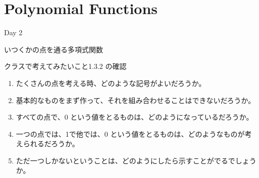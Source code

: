 \documentclass[10pt, dvipdfmx]{beamer}
\begin{document}
\section{Polynomial Functions}
\begin{frame}{Day 2}
\begin{center}{\huge いつくかの点を通る多項式関数}


\end{center}

\end{frame}
\begin{frame}{クラスで考えてみたいこと}{1.3.2 の確認}
\begin{enumerate}
\item たくさんの点を考える時、どのような記号がよいだろうか。

\medskip
\item 基本的なものをまず作って、それを組み合わせることはできないだろうか。

\medskip
\item すべての点で、$0$ という値をとるものは、どのようになっているだろうか。

\medskip
\item 一つの点では、1で他では、$0$ という値をとるものは、どのようなものが考えられるだろうか。

\medskip
\item ただ一つしかないということは、どのようにしたら示すことがでるでしょうか。
\end{enumerate}
\end{frame}
\end{document}
